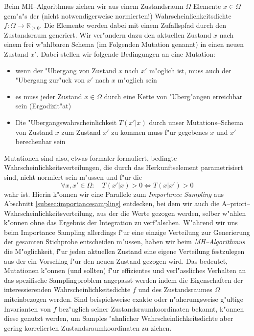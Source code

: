 	Beim MH--Algorithmus ziehen wir aus einem Zustandsraum $\Omega$ Elemente $x \in \Omega$ gem"a"s der (nicht notwendigerweise normierten!) Wahrscheinlichkeitsdichte $f : \Omega \rightarrow \mathbb{R}_{\geq 0}$. Die Elemente werden dabei mit einem Zufallspfad durch den Zustandsraum generiert. Wir ver"andern dazu den aktuellen Zustand $x$ nach einem frei w"ahlbaren Schema (im Folgenden Mutation genannt) in einen neuen Zustand $x'$.
	Dabei stellen wir folgende Bedingungen an eine Mutation:
	\begin{itemize}
		\item{wenn der "Ubergang von Zustand $x$ nach $x'$ m"oglich ist, muss auch der "Ubergang zur"uck von $x'$ nach $x$ m"oglich sein}
		\item{es muss jeder Zustand $x \in \Omega$ durch eine Kette von "Uberg"angen erreichbar sein (Ergodizit"at)}
		\item{Die "Ubergangswahrscheinlichkeit $T(x'|x)$ durch unser Mutations--Schema von Zustand $x$ zum Zustand $x'$ zu kommen muss f"ur gegebenes $x$ und $x'$ berechenbar sein}
	\end{itemize}
	Mutationen sind also, etwas formaler formuliert, bedingte Wahrscheinlichkeitsverteilungen, die durch das Herkunftselement parametrisiert sind, nicht normiert sein m"ussen und f"ur die
	$$\forall x,x'\in\Omega : \quad T(x'|x)>0 \Leftrightarrow T(x|x')>0$$
	wahr ist. Hierin k"onnen wir eine Parallele zum {\em Importance Sampling} aus Abschnitt \ref{subsec:importancesampling} entdecken, bei dem wir auch die A--priori--Wahr\-schein\-lich\-keits\-ver\-tei\-lung, aus der die Werte gezogen werden, selber w"ahlen k"onnen ohne das Ergebnis der Integration zu verf"alschen. W"ahrend wir uns beim Importance Sampling allerdings f"ur eine einzige Verteilung zur Generierung der gesamten Stichprobe entscheiden m"ussen, haben wir beim {\em MH--Algorithmus} die M"oglichkeit, f"ur jeden aktuellen Zustand eine eigene Verteilung festzulegen aus der ein Vorschlag f"ur den neuen Zustand gezogen wird.
	Das bedeutet, Mutationen k"onnen (und sollten) f"ur effizientes und verl"assliches Verhalten an das spezifische Samplingproblem angepasst werden indem die Eigenschaften der interessierenden Wahrscheinlichkeitsdichte $f$ und des Zustandsraumes $\Omega$ miteinbezogen werden. Sind beispielsweise exakte oder n"aherungsweise g"ultige Invarianten von $f$ bez"uglich seiner Zustandsraumkoordinaten bekannt, k"onnen diese genutzt werden, um Samples "ahnlicher Wahrscheinlichkeitsdichte aber gering korrelierten Zustandsraumkoordinaten zu ziehen.
	
